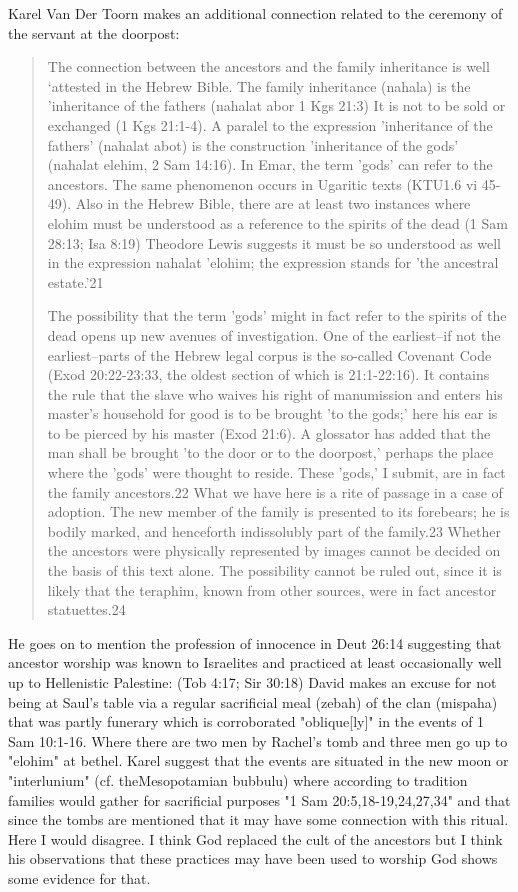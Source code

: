 \documentclass[11pt]{article}
\begin{document}
Karel Van Der Toorn makes an additional connection related to the ceremony of the servant at the doorpost:
\begin{quote}
The connection between the ancestors and the family inheritance is well `attested in the Hebrew Bible. The family inheritance (nahala) is the 'inheritance of the fathers (nahalat abor 1 Kgs 21:3) It is not to be sold or exchanged (1 Kgs 21:1-4). A paralel to the expression 'inheritance of the fathers' (nahalat abot) is the construction 'inheritance of the gods' (nahalat elehim, 2 Sam 14:16). In Emar, the term 'gods' can refer to the ancestors. The same phenomenon occurs in Ugaritic texts (KTU1.6 vi 45-49). Also in the Hebrew Bible, there are at least two instances where elohim must be understood as a reference to the spirits of the dead (1 Sam 28:13; Isa 8:19) Theodore Lewis suggests it must be so understood as well in the expression nahalat 'elohim; the expression stands for 'the ancestral estate.'21

The possibility that the term 'gods' might in fact refer to the spirits of the dead opens up new avenues of investigation. One of the earliest--if not the earliest--parts of the Hebrew legal corpus is the so-called Covenant Code (Exod 20:22-23:33, the oldest section of which is 21:1-22:16). It contains the rule that the slave who waives his right of manumission and enters his master's household for good is to be brought 'to the gods;' here his ear is to be pierced by his master (Exod 21:6). A glossator has added that the man shall be brought 'to the door or to the doorpost,' perhaps the place where the 'gods' were thought to reside. These 'gods,' I submit, are in fact the family ancestors.22 What we have here is a rite of passage in a case of adoption. The new member of the family is presented to its forebears; he is bodily marked, and henceforth indissolubly part of the family.23 Whether the ancestors were physically represented by images cannot be decided on the basis of this text alone. The possibility cannot be ruled out, since it is likely that the teraphim, known from other sources, were in fact ancestor statuettes.24
\end{quote}

He goes on to mention the profession of innocence in Deut 26:14 suggesting that ancestor worship was known to Israelites and practiced at least occasionally well up to Hellenistic Palestine: (Tob 4:17; Sir 30:18) David makes an excuse for not being at Saul's table via a regular sacrificial meal (zebah) of the clan (mispaha) that was partly funerary which is corroborated "oblique[ly]" in the events of 1 Sam 10:1-16. Where there are two men by Rachel's tomb and three men go up to "elohim" at bethel. Karel suggest that the events are situated in the new moon or "interlunium" (cf. theMesopotamian bubbulu) where according to tradition families would gather for sacrificial purposes "1 Sam 20:5,18-19,24,27,34" and that since the tombs are mentioned that it may have some connection with this ritual. Here I would disagree. I think God replaced the cult of the ancestors but I think his observations that these practices may have been used to worship God shows some evidence for that.
\end{document}
